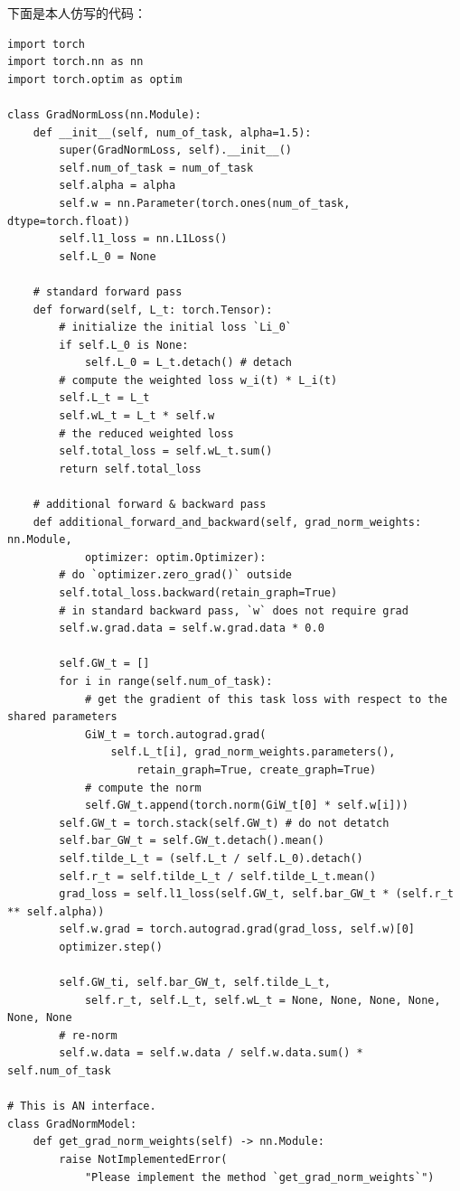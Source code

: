 \documentclass{ctexart}
\begin{document}
下面是本人仿写的代码：
\begin{verbatim}
import torch
import torch.nn as nn
import torch.optim as optim

class GradNormLoss(nn.Module):
    def __init__(self, num_of_task, alpha=1.5):
        super(GradNormLoss, self).__init__()
        self.num_of_task = num_of_task
        self.alpha = alpha
        self.w = nn.Parameter(torch.ones(num_of_task, dtype=torch.float))
        self.l1_loss = nn.L1Loss()
        self.L_0 = None

    # standard forward pass
    def forward(self, L_t: torch.Tensor):
        # initialize the initial loss `Li_0`
        if self.L_0 is None:
            self.L_0 = L_t.detach() # detach
        # compute the weighted loss w_i(t) * L_i(t)
        self.L_t = L_t
        self.wL_t = L_t * self.w
        # the reduced weighted loss
        self.total_loss = self.wL_t.sum()
        return self.total_loss

    # additional forward & backward pass
    def additional_forward_and_backward(self, grad_norm_weights: nn.Module, 
            optimizer: optim.Optimizer):
        # do `optimizer.zero_grad()` outside
        self.total_loss.backward(retain_graph=True)
        # in standard backward pass, `w` does not require grad
        self.w.grad.data = self.w.grad.data * 0.0

        self.GW_t = []
        for i in range(self.num_of_task):
            # get the gradient of this task loss with respect to the shared parameters
            GiW_t = torch.autograd.grad(
                self.L_t[i], grad_norm_weights.parameters(),
                    retain_graph=True, create_graph=True)
            # compute the norm
            self.GW_t.append(torch.norm(GiW_t[0] * self.w[i]))
        self.GW_t = torch.stack(self.GW_t) # do not detatch
        self.bar_GW_t = self.GW_t.detach().mean()
        self.tilde_L_t = (self.L_t / self.L_0).detach()
        self.r_t = self.tilde_L_t / self.tilde_L_t.mean()
        grad_loss = self.l1_loss(self.GW_t, self.bar_GW_t * (self.r_t ** self.alpha))
        self.w.grad = torch.autograd.grad(grad_loss, self.w)[0]
        optimizer.step()

        self.GW_ti, self.bar_GW_t, self.tilde_L_t, 
            self.r_t, self.L_t, self.wL_t = None, None, None, None, None, None
        # re-norm
        self.w.data = self.w.data / self.w.data.sum() * self.num_of_task

# This is AN interface.
class GradNormModel:
    def get_grad_norm_weights(self) -> nn.Module:
        raise NotImplementedError(
            "Please implement the method `get_grad_norm_weights`")
\end{verbatim}
\end{document}
